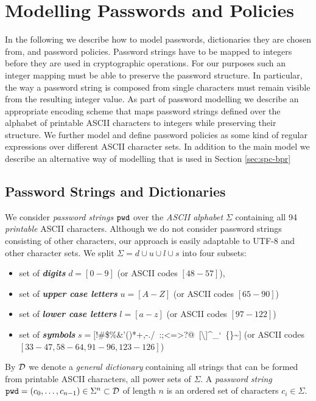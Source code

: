 \section{Modelling Passwords and Policies} \label{sec:passwords}

In the following we describe how to model passwords, dictionaries they are chosen from, and password policies. 
Password strings have to be mapped to integers before they are used in cryptographic operations. 
For our purposes such an integer mapping must be able to preserve the password structure. 
In particular, the way a password string is composed from single characters must remain visible from the resulting integer value. 
As part of password modelling we describe an appropriate encoding scheme that maps password strings defined over the alphabet of printable \ac{ASCII} characters to integers while preserving their structure. 
We further model and define password policies as some kind of regular expressions over different \ac{ASCII} character sets.
In addition to the main model we describe an alternative way of modelling that is used in Section \ref{sec:spc-bpr}

\subsection{Password Strings and Dictionaries}
We consider \emph{password strings} $\mathtt{pwd}$ over the \emph{\ac{ASCII}  alphabet} $\Sigma$ containing all 94 \emph{printable} \ac{ASCII}  characters.
Although we do not consider password strings consisting of other characters, our approach is easily adaptable to \ac{UTF-8} and other character sets.
We split $\Sigma=d\cup u\cup l\cup s$ into four subsets:
\begin{itemize}
	\item set of \emph{\bf digits} $d=[0-9]$ (or \ac{ASCII}  codes $[48-57]$),
	\item set of \emph{\bf upper case letters} $u=[A-Z]$ (or \ac{ASCII}  codes $[65-90]$)
	\item set of \emph{\bf lower case letters} $l=[a-z]$ (or \ac{ASCII}  codes $[97-122]$)
	\item set of \emph{\bf symbols} $s=[$!\textquotedbl\#\$\%\&'()*+,-./~:;\textless=\textgreater?@~[\textbackslash]\^{}\_`~\{\textbar\}\textasciitilde$]$ (or \ac{ASCII}  codes $[33-47,58-64,91-96,123-126]$)
\end{itemize}

\noindent
By $\mathcal{D}$ we denote a \emph{general dictionary} containing all strings that can be formed from printable \ac{ASCII}  characters, \ie all power sets of $\Sigma$.
A \emph{password string} $\mathtt{pwd}=(c_{0},\dots,c_{n-1})\in\Sigma^n\subset\mathcal{D}$ of length $n$ is an ordered set of characters $c_i\in\Sigma$.

